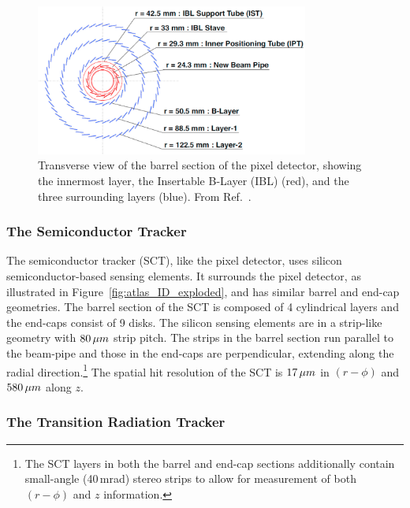 \begin{figure}[!htb]
    \begin{center}
        \includegraphics[width=0.8\textwidth]{figures/chapter2/pixel_detector_trans}
        \caption{
            Transverse view of the barrel section of the pixel detector, showing
            the innermost layer, the Insertable B-Layer (IBL) (red), and the
            three surrounding layers (blue). From Ref.~\cite{Backhaus:2016ctq}.
        }
        \label{fig:pixel_detector_trans}
    \end{center}
\end{figure}

\subsubsection{The Semiconductor Tracker}
\label{sec:id_sct}

The semiconductor tracker (SCT), like the pixel detector, uses silicon semiconductor-based sensing
elements.
It surrounds the pixel detector, as illustrated in Figure~\ref{fig:atlas_ID_exploded},
and has similar barrel and end-cap geometries.
The barrel section of the SCT is composed of 4 cylindrical layers and the end-caps consist
of 9 disks.
The silicon sensing elements are in a strip-like geometry with
$80\,\mu m$ strip pitch.
The strips in the barrel section run parallel to the beam-pipe and those in the
end-caps are perpendicular, extending along the radial direction.\footnote{
The SCT layers in both the barrel and end-cap sections additionally contain small-angle (40\,mrad) stereo strips to allow for measurement of both
$(r-\phi)$ and $z$ information.}
The spatial hit resolution of the SCT is $17\,\mu m$ in $(r-\phi)$ and $580\,\mu m$
along $z$.

\subsubsection{The Transition Radiation Tracker}
\label{sec:trt}

